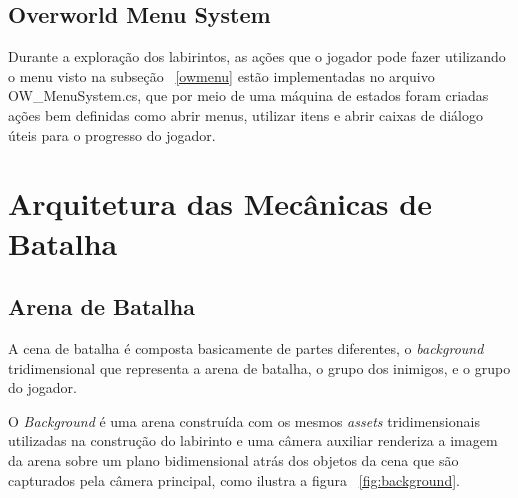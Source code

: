 \documentclass[
	12pt,				%
	openright,			%
	twoside,			%
	a4paper,			%
	english,			%
	french,				%
	spanish,			%
	brazil				%
	]{abntex2}
\begin{document}
\subsection{Overworld Menu System}

	Durante a exploração dos labirintos, as ações que o jogador pode fazer utilizando o menu visto na subseção ~\ref{owmenu} estão implementadas no arquivo OW\_MenuSystem.cs, que por meio de uma máquina de estados foram criadas ações bem definidas como abrir menus, utilizar itens e abrir caixas de diálogo úteis para o progresso do jogador.

\section{Arquitetura das Mecânicas de Batalha}

\subsection{Arena de Batalha}

	A cena de batalha é composta basicamente de partes diferentes, o \emph{background} tridimensional que representa a arena de batalha, o grupo dos inimigos, e o grupo do jogador.
	
	O \emph{Background} é uma arena construída com os mesmos \emph{assets} tridimensionais utilizadas na construção do labirinto e uma câmera auxiliar renderiza a imagem da arena sobre um plano bidimensional atrás dos objetos da cena que são capturados pela câmera principal, como ilustra a figura ~\ref{fig:background}.
	
\end{document}
